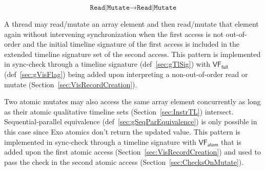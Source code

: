 
\begin{equation*}
    \texttt{Read|Mutate} \to \texttt{Read|Mutate}
\end{equation*}

A thread may read/mutate an array element and then read/mutate that element again without intervening synchronization when the first access is not out-of-order and the initial timeline signature of the first access is included in the extended timeline signature set of the second access.
This pattern is implemented in sync-check through a timeline signature (def~\ref{sec:gTlSig}) with $\mathsf{VF_{full}}$ (def~\ref{sec:gVisFlag}) being added upon interpreting a non-out-of-order read or mutate (Section~\ref{sec:VisRecordCreation}).

Two atomic mutates may also access the same array element concurrently as long as their atomic qualitative timeline sets (Section~\ref{sec:InstrTL}) intersect.
Sequential-parallel equivalence (def~\ref{sec:gSeqParEquivalence}) is only possible in this case since Exo atomics don't return the updated value.
This pattern is implemented in sync-check through a timeline signature with $\mathsf{VF_{atom}}$ that is added upon the first atomic access (Section~\ref{sec:VisRecordCreation}) and used to pass the check in the second atomic access (Section~\ref{sec:ChecksOnMutate}).


